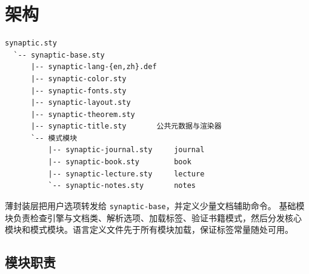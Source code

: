 \documentclass[a4paper,11pt]{scrartcl}
\begin{document}
\SynapticMakeTitle

\section{架构}

\begin{verbatim}
synaptic.sty
  `-- synaptic-base.sty
      |-- synaptic-lang-{en,zh}.def
      |-- synaptic-color.sty
      |-- synaptic-fonts.sty
      |-- synaptic-layout.sty
      |-- synaptic-theorem.sty
      |-- synaptic-title.sty       公共元数据与渲染器
      `-- 模式模块
          |-- synaptic-journal.sty     journal
          |-- synaptic-book.sty        book
          |-- synaptic-lecture.sty     lecture
          `-- synaptic-notes.sty       notes
\end{verbatim}

薄封装层把用户选项转发给 \texttt{synaptic-base}，并定义少量文档辅助命令。
基础模块负责检查引擎与文档类、解析选项、加载标签、验证书籍模式，然后分发核心
模块和模式模块。语言定义文件先于所有模块加载，保证标签常量随处可用。

\subsection{模块职责}

\end{document}
